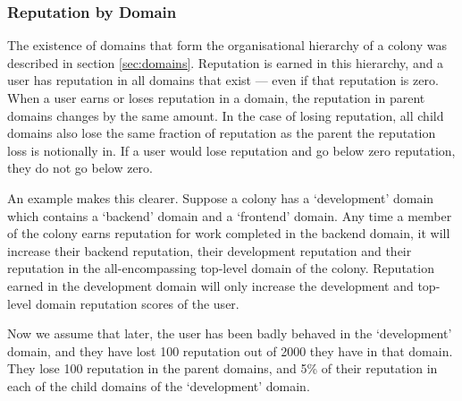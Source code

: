 



%

%
%
\subsubsection{Reputation by Domain}\label{sec:rep-by-domain}
The existence of domains that form the organisational hierarchy of a colony was described in section \ref{sec:domains}. Reputation is earned in this hierarchy, and a user has reputation in all domains that exist --- even if that reputation is zero. When a user earns or loses reputation in a domain, the reputation in parent domains changes by the same amount. In the case of losing reputation, all child domains also lose the same fraction of reputation as the parent the reputation loss is notionally in. If a user would lose reputation and go below zero reputation, they do not go below zero.

An example makes this clearer. Suppose a colony has a `development' domain which contains a `backend' domain and a `frontend' domain. Any time a member of the colony earns reputation for work completed in the backend domain, it will increase their backend reputation, their development reputation and their reputation in the all-encompassing top-level domain of the colony. Reputation earned in the development domain will only increase the development and top-level domain reputation scores of the user.

Now we assume that later, the user has been badly behaved in the `development' domain, and they have lost 100 reputation out of 2000 they have in that domain. They lose 100 reputation in the parent domains, and 5\% of their reputation in each of the child domains of the `development' domain. 

